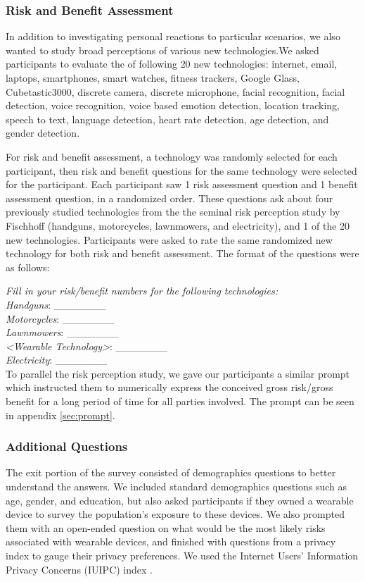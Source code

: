 \documentclass{acm_proc_article-sp}
\begin{document}
\subsubsection{Risk and Benefit Assessment}

In addition to investigating personal reactions to particular scenarios, we also wanted to study broad perceptions of various new technologies.We asked participants to evaluate the of following 20 new technologies: internet, email, laptops, smartphones, smart watches, fitness trackers, Google Glass, Cubetastic3000, discrete camera, discrete microphone, facial recognition, facial detection, voice recognition, voice based emotion detection, location tracking, speech to text, language detection, heart rate detection, age detection, and gender detection. 

For risk and benefit assessment, a technology was randomly selected for each participant, then risk and benefit questions for the same technology were selected for the participant. Each participant saw 1 risk assessment question and 1 benefit assessment question, in a randomized order. These questions ask about four previously studied technologies from the the seminal risk perception study by Fischhoff \cite{Fischhoff} (handguns, motorcycles, lawnmowers, and electricity), and 1 of the 20 new technologies.  Participants were asked to rate the same randomized new technology for both risk and benefit assessment. The format of the questions were as follows:

\textit{Fill in your risk/benefit numbers for the following technologies:}\\[-.5cm]

\textit{Handguns}: \_\_\_\_\_\_\_ \\
\textit{Motorcycles}: \_\_\_\_\_\_\_\\
\textit{Lawnmowers}: \_\_\_\_\_\_\_\\
\textit{<Wearable Technology>}: \_\_\_\_\_\_\_\\
\textit{Electricity}: \_\_\_\_\_\_\_\\ [-.5cm]

To parallel the risk perception study, we gave our participants a similar prompt which instructed them to numerically express the conceived gross risk/gross benefit for a long period of time for all parties involved. The prompt can be seen in appendix \ref{sec:prompt}. 

\subsubsection{Additional Questions}
The exit portion of the survey consisted of demographics questions to better understand the answers. We included standard demographics questions such as age, gender, and education, but also asked participants if they owned a wearable device to survey the population's exposure to these devices. We also prompted them with an open-ended question on what would be the most likely risks associated with wearable devices, and finished with questions from a privacy index to gauge their privacy preferences. We used the Internet Users' Information Privacy Concerns (IUIPC) index \cite{malhotra2004internet}.
\end{document}
